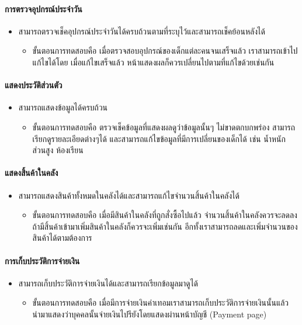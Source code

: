 \paragraph{การตรวจอุปกรณ์ประจำวัน}
\begin{itemize}
    \item สามารถตรวจเช็คอุปกรณ์ประจำวันได้ครบถ้วนตามที่ระบุไว้และสามารถเช็คย้อนหลังได้
    \begin{itemize}
        \item ขั้นตอนการทดสอบคือ เมื่อตรวจสอบอุปกรณ์ของเด็กแต่ละคนจนเสร็จแล้ว  เราสามารถเข้าไปแก้ไขได้โดย  เมื่อแก้ไขเสร็จแล้ว  
        หน้าแสดงผลก็ควรเปลี่ยนไปตามที่แก้ไขด้วยเช่นกัน        
    \end{itemize}
\end{itemize}
\paragraph{แสดงประวัติส่วนตัว}
\begin{itemize}
    \item สามารถแสดงข้อมูลได้ครบถ้วน
    \begin{itemize}
        \item ขั้นตอนการทดสอบคือ ตรวจเช็คข้อมูลที่แสดงผลดูว่าข้อมูลนั้นๆ ไม่ขาดตกบกพร่อง สามารถเรียกดูรายละเอียดต่างๆได้
    และสามารถแก้ไขข้อมูลที่มีการเปลี่ยนของเด็กได้ เช่น น้ำหนัก  ส่วนสูง  ห้องเรียน         
    \end{itemize}
\end{itemize}
\paragraph{แสดงสิ้นค้าในคลัง}
\begin{itemize}
    \item สามารถแสดงสินค้าทั้งหมดในคลังได้และสามารถแก้ไขจํานวนสิ้นค้าในคลังได้
    \begin{itemize}
        \item ขั้นตอนการทดสอบคือ  เมื่อมีสินค้าในคลังที่ถูกสั่งซื้อไปแล้ว จำนวนสิ้นค้าในคลังควรจะลดลง ถ้ามีสิ้นค้าเข้ามาเพิ่มสินค้าในคลังก็ควรจะเพิ่มเช่นกัน  อีกทั้งเราสามารถลดและเพิ่มจำนวนของสินค้าได้ตามต้องการ 	
    \end{itemize}
\end{itemize}
\paragraph{การเก็บประวัติการจ่ายเงิน}
\begin{itemize}
    \item สามารถเก็บประวัติการจ่ายเงินได้และสามารถเรียกข้อมูลมาดูได้
    \begin{itemize}
        \item ขั้นตอนการทดสอบคือ เมื่อมีการจ่ายเงินค่าเทอมเราสามารถเก็บประวัติการจ่ายเงินนั้นแล้ว  นำมาแสดงว่าบุคคลนั้นจ่ายเงินไปรึยังโดยแสดงผ่านหน้าบัญชี (Payment page)
    \end{itemize}
\end{itemize}


